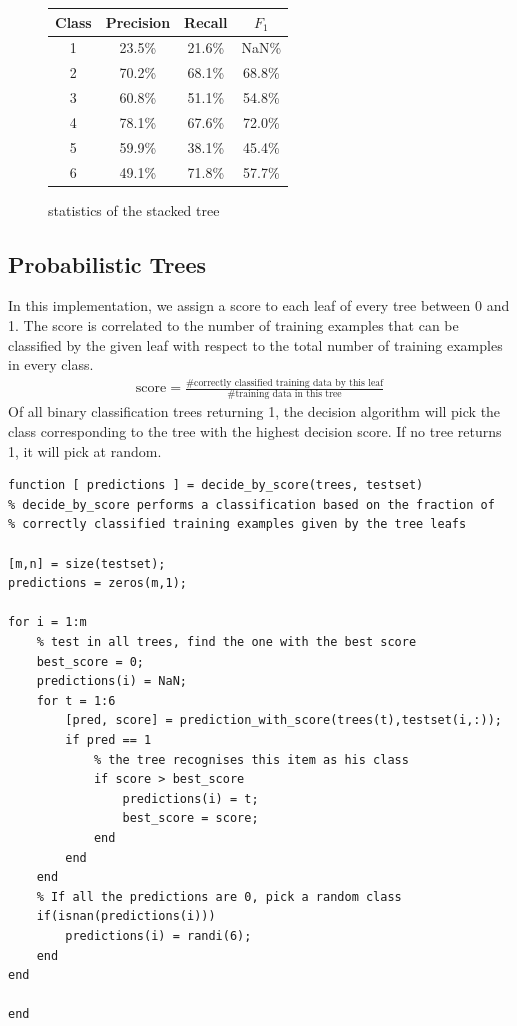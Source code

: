 \documentclass{article}
\begin{document}
\begin{figure}[h]
{        \begin{tabular}{c | c c c}
        Class & Precision & Recall & $F_1$ \\
        \hline \hline
        1 & 23.5\% & 21.6\% & NaN\% \\ 
        2 & 70.2\% & 68.1\% & 68.8\% \\ 
        3 & 60.8\% & 51.1\% & 54.8\% \\ 
        4 & 78.1\% & 67.6\% & 72.0\% \\ 
        5 & 59.9\% & 38.1\% & 45.4\% \\ 
        6 & 49.1\% & 71.8\% & 57.7\% \\ 
        \end{tabular}
    }%
    \hspace*{\fill}
    
    \caption{statistics of the stacked tree}
\end{figure}





\subsection{Probabilistic Trees}
In this implementation, we assign a score to each leaf of every tree between 0 and 1. The score is correlated to the number of training examples that can be classified by the given leaf with respect to the total number of training examples in every class.
\begin{align*}
    \textrm{score} = \frac{\textrm{\# correctly classified training data by this leaf}}{\textrm{\# training data in this tree}}
\end{align*}
Of all binary classification trees returning 1, the decision algorithm will pick the class corresponding to the tree with the highest decision score. If no tree returns 1, it will pick at random.
\begin{lstlisting}
function [ predictions ] = decide_by_score(trees, testset)
% decide_by_score performs a classification based on the fraction of
% correctly classified training examples given by the tree leafs

[m,n] = size(testset);
predictions = zeros(m,1);

for i = 1:m
    % test in all trees, find the one with the best score
    best_score = 0;
    predictions(i) = NaN;
    for t = 1:6
        [pred, score] = prediction_with_score(trees(t),testset(i,:));
        if pred == 1
            % the tree recognises this item as his class
            if score > best_score
                predictions(i) = t;
                best_score = score;
            end
        end
    end
    % If all the predictions are 0, pick a random class
    if(isnan(predictions(i)))
        predictions(i) = randi(6);
    end
end

end
\end{lstlisting}
\end{document}
